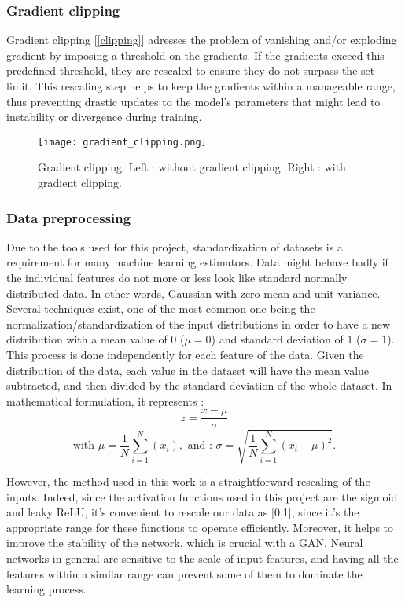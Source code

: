 \documentclass [12pt] {article}
\numberwithin{equation}{section} %
\numberwithin{figure}{section}   %
\begin{document}
\subsubsection*{Gradient clipping}

Gradient clipping [\ref{clipping}] adresses the problem of vanishing and/or exploding gradient by imposing a threshold on the gradients. If the gradients exceed this predefined threshold, they are rescaled to ensure they do not surpass the set limit. This rescaling step helps to keep the gradients within a manageable range, thus preventing drastic updates to the model’s parameters that might lead to instability or divergence during training.

\begin{figure}[H]
    \centering
    \texttt{[image: gradient\_clipping.png]}
    \caption{Gradient clipping. Left : without gradient clipping. Right : with gradient clipping.}
    \label{gradient clipping}
\end{figure}

\subsubsection*{Data preprocessing}

Due to the tools used for this project, standardization of datasets is a requirement for many machine learning estimators. Data might behave badly if the individual features do not more or less look like standard normally distributed data. In other words, Gaussian with zero mean and unit variance.\\
Several techniques exist, one of the most common one being the normalization/standardization of the input distributions in order to have a new distribution with a mean value of 0 ($\mu = 0$) and standard deviation of 1 ($\sigma = 1$). This process is done independently for each feature of the data. Given the distribution of the data, each value in the dataset will have the mean value subtracted, and then divided by the standard deviation of the whole dataset. In mathematical formulation, it represents : 
\begin{equation}
    z = \frac{x - \mu}{\sigma}
\end{equation}
\begin{equation}
    \text{with  } \mu = \frac{1}{N} \sum^N_{i=1} (x_i), \text{ and : } \sigma = \sqrt{\frac{1}{N} \sum^N_{i=1} (x_i - \mu)^2}.
\end{equation}

However, the method used in this work is a straightforward rescaling of the inputs. Indeed, since the activation functions used in this project are the sigmoid and leaky ReLU, it's convenient to rescale our data as [0,1], since it's the appropriate range for these functions to operate efficiently. Moreover, it helps to improve the stability of the network, which is crucial with a GAN. Neural networks in general are sensitive to the scale of input features, and having all the features within a similar range can prevent some of them to dominate the learning process.\\
\end{document}
